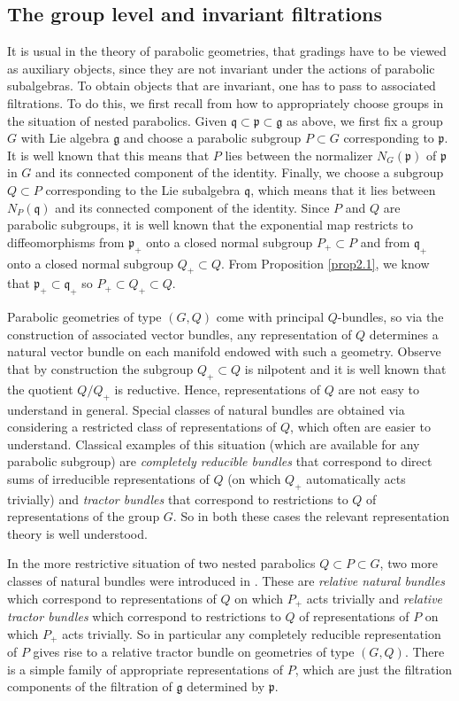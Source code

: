 \documentclass[pdftex]{sigma}
\numberwithin{equation}{section}
\def\frak{\mathfrak}
\begin{document}
\subsection{The group level and invariant filtrations}\label{2.2}
It is usual in the theory of parabolic geometries, that gradings have to be viewed as
auxiliary objects, since they are not invariant under the actions of parabolic
subalgebras. To obtain objects that are invariant, one has to pass to associated
filtrations. To do this, we first recall from \cite{Rel-BGG1} how to appropriately
choose groups in the situation of nested parabolics. Given
$\frak q\subset\frak p\subset\frak g$ as above, we first fix a group $G$ with Lie
algebra $\frak g$ and choose a parabolic subgroup $P\subset G$ corresponding to
$\frak p$. It is well known that this means that $P$ lies between the normalizer
$N_G(\frak p)$ of $\frak p$ in $G$ and its connected component of the
identity. Finally, we choose a subgroup $Q\subset P$ corresponding to the Lie
subalgebra $\frak q$, which means that it lies between $N_P(\frak q)$ and its
connected component of the identity. Since $P$ and $Q$ are parabolic subgroups, it is
well known that the exponential map restricts to diffeomorphisms from $\frak p_+$
onto a closed normal subgroup $P_+\subset P$ and from $\frak q_+$ onto a closed
normal subgroup $Q_+\subset Q$. From Proposition \ref{prop2.1}, we know that
$\frak p_+\subset\frak q_+$ so $P_+\subset Q_+\subset Q$.

Parabolic geometries of type $(G,Q)$ come with principal $Q$-bundles, so via the
construction of associated vector bundles, any representation of $Q$ determines a
natural vector bundle on each manifold endowed with such a geometry. Observe that by
construction the subgroup $Q_+\subset Q$ is nilpotent and it is well known that the
quotient $Q/Q_+$ is reductive. Hence, representations of $Q$ are not easy to
understand in general. Special classes of natural bundles are obtained via
considering a restricted class of representations of $Q$, which often are easier to
understand. Classical examples of this situation (which are available for any
parabolic subgroup) are \textit{completely reducible bundles} that correspond to
direct sums of irreducible representations of $Q$ (on which $Q_+$ automatically acts
trivially) and \textit{tractor bundles} that correspond to restrictions to $Q$ of
representations of the group $G$. So in both these cases the relevant representation
theory is well understood.

In the more restrictive situation of two nested parabolics $Q\subset P\subset G$, two
more classes of natural bundles were introduced in
\cite[Definition 2.1]{Rel-BGG2}. These are \textit{relative natural bundles} which correspond to
representations of $Q$ on which $P_+$ acts trivially and \textit{relative tractor
 bundles} which correspond to restrictions to $Q$ of representations of $P$ on which
$P_+$ acts trivially. So in particular any completely reducible representation of $P$
gives rise to a relative tractor bundle on geometries of type $(G,Q)$. There is a
simple family of appropriate representations of $P$, which are just the filtration
components of the filtration of $\frak g$ determined by $\frak p$.
\end{document}
